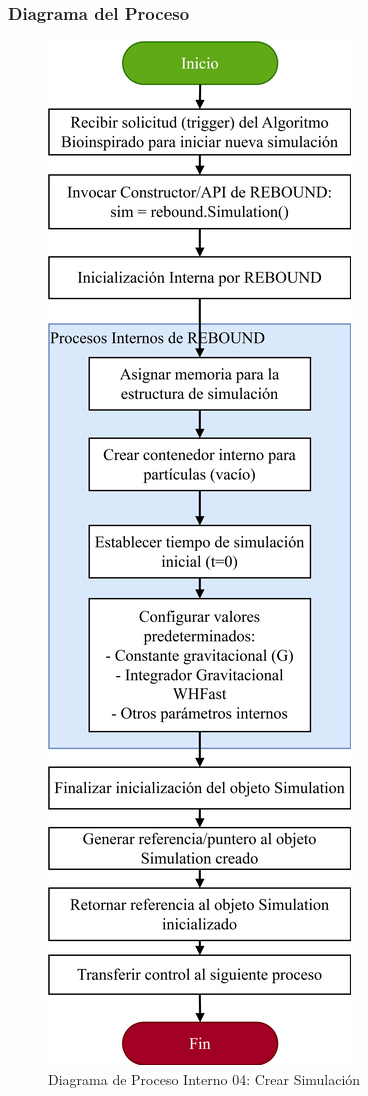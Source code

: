 \subsubsection{Diagrama del Proceso}
\begin{figure}[H]
    \centering
    \includegraphics[width=\textwidth]{img/Analisis/DiagramaProcesos/DiagramaProceso04_CrearSimulacion.png}
    \caption{Diagrama de Proceso Interno 04: Crear Simulación}%
    \label{fig:process_diagram04}
\end{figure}